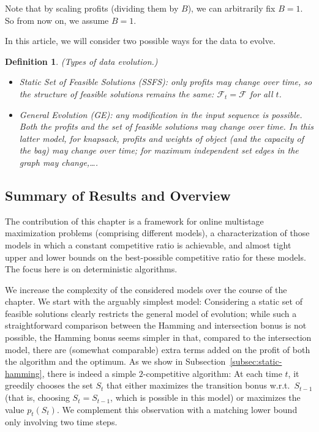 \documentclass[a4paper]{book}
\newtheorem{definition}{Definition}
\newcommand{\finalversion}[1]{#1}
\begin{document}
Note that by scaling profits (dividing them by $B$), we can arbitrarily fix $B=1$. So from now on, we assume $B=1$.



In this article, we will consider two possible ways for the data to evolve. 

\begin{definition}
\emph{(Types of data evolution.)}
\begin{itemize}
\item \emph{Static Set of Feasible Solutions (SSFS):}  only profits may change over time, so the structure of feasible solutions remains the same: $\mathcal{F}_t=\mathcal{F}$ for all $t$. 

\item \emph{General Evolution (GE):}  any modification in the input sequence is possible. Both the profits and the set of feasible solutions may change over time. In this latter model, for knapsack, profits and weights of object (and the capacity of the bag) may change over time; for maximum independent set edges in the graph may change,\dots.   
\end{itemize}
\end{definition}


\subsection{Summary of Results and Overview}\label{subsec:results}

The contribution of this chapter is a framework for online multistage maximization problems (comprising different models), a characterization of those models in which a constant competitive ratio is achievable, and almost tight upper and lower bounds on the best-possible competitive ratio for these models. \finalversion{The focus here is on deterministic algorithms.}

We increase the complexity of the considered models over the course of the chapter. We start with the arguably simplest model: Considering a static set of feasible solutions clearly restricts the general model of evolution; while such a straightforward comparison between the Hamming and intersection bonus is not possible, the Hamming bonus seems simpler in that, compared to the intersection model, there are (somewhat comparable) extra terms added on the profit of both the algorithm and the optimum. As we show in Subsection~\ref{subsec:static-hamming}, there is indeed a simple $2$-competitive algorithm: At each time $t$, it greedily chooses the set $S_t$ that either maximizes the transition bonus w.r.t.\ $S_{t-1}$ (that is, choosing $S_t=S_{t-1}$, which is possible in this model) or maximizes the value $p_t(S_t)$. We complement this observation with a matching lower bound only involving two time steps.
\end{document}

